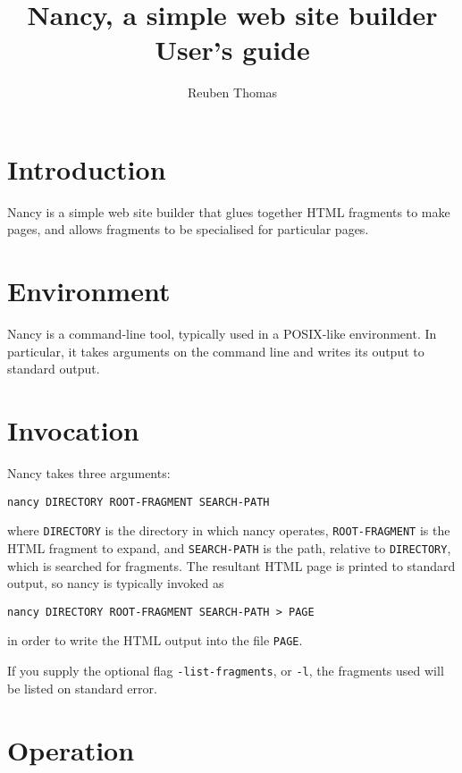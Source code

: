 \documentclass[english]{scrartcl}
\begin{document}
\title{Nancy, a simple web site builder\\User's guide}
\date{\relax}
\author{Reuben Thomas}
\maketitle

\section{Introduction}

Nancy is a simple web site builder that glues together HTML fragments
to make pages, and allows fragments to be specialised for particular
pages.

\section{Environment}

Nancy is a command-line tool, typically used in a POSIX-like
environment. In particular, it takes arguments on the command line and
writes its output to standard output.

\section{Invocation}

Nancy takes three arguments:

\begin{verbatim}
nancy DIRECTORY ROOT-FRAGMENT SEARCH-PATH
\end{verbatim}

where \texttt{DIRECTORY} is the directory in which nancy operates,
\texttt{ROOT-FRAGMENT} is the HTML fragment to expand, and
\texttt{SEARCH-PATH} is the path, relative to \texttt{DIRECTORY},
which is searched for fragments. The resultant HTML page is printed to
standard output, so nancy is typically invoked as

\begin{verbatim}
nancy DIRECTORY ROOT-FRAGMENT SEARCH-PATH > PAGE
\end{verbatim}

in order to write the HTML output into the file \texttt{PAGE}.

If you supply the optional flag \verb|-list-fragments|, or \verb|-l|,
the fragments used will be listed on standard error.

\section{Operation}
\label{operation}
\end{document}
